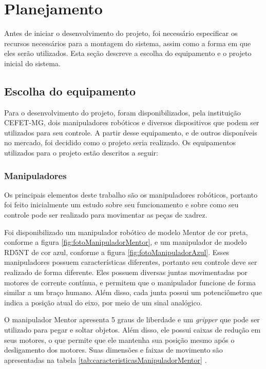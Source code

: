 \chapter[Planejamento]{Planejamento}
\label{cap:planejamento}

Antes de iniciar o desenvolvimento do projeto, foi necessário especificar os recursos necessários para a montagem do sistema, assim como a forma em que eles serão utilizados.
Esta seção descreve a escolha do equipamento e o projeto inicial do sistema.

\section[Escolha do equipamento]{Escolha do equipamento}
\label{sec:escolhaEquipamento}

Para o desenvolvimento do projeto, foram disponibilizados, pela instituição CEFET-MG, dois manipuladores robóticos e diversos dispositivos que podem ser utilizados para seu controle.
A partir desse equipamento, e de outros disponíveis no mercado, foi decidido como o projeto seria realizado.
Os equipamentos utilizados para o projeto estão descritos a seguir:

\subsection[Manipuladores]{Manipuladores}

Os principais elementos deste trabalho são os manipuladores robóticos, portanto foi feito inicialmente um estudo sobre seu funcionamento e sobre como seu controle pode ser realizado para movimentar as peças de xadrez.

Foi disponibilizado um manipulador robótico de modelo Mentor de cor preta, conforme a figura \ref{fig:fotoManipuladorMentor}, e um manipulador de modelo RD5NT de cor azul, conforme a figura \ref{fig:fotoManipuladorAzul}.
Esses manipuladores possuem características diferentes, portanto seu controle deve ser realizado de forma diferente.
Eles possuem diversas juntas movimentadas por motores de corrente contínua, e permitem que o manipulador funcione de forma similar a um braço humano.
Além disso, cada junta possui um potenciômetro que indica a posição atual do eixo, por meio de um sinal analógico.

O manipulador Mentor apresenta 5 graus de liberdade e um \textit{gripper} que pode ser utilizado para pegar e soltar objetos.
Além disso, ele possui caixas de redução em seus motores, o que permite que ele mantenha sua posição mesmo após o desligamento dos motores.
Suas dimensões e faixas de movimento são apresentadas na tabela \ref{tab:caracteristicasManipuladorMentor} \cite{mentor_forward_kinematics}.

